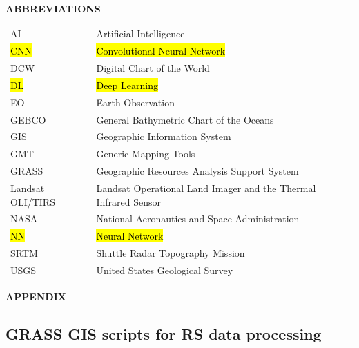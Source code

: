 \documentclass[12pt,a4paper,oneside]{article}
\def \newsection{\vspace{12pt}\textbf}
\begin{document}
\vspace{12pt}

\newsection {ABBREVIATIONS}
\vspace{12pt}

\begin{tabular}{@{}ll}
AI & Artificial Intelligence \\
\hl{CNN} & \hl{Convolutional Neural Network} \\
DCW & Digital Chart of the World \\
\hl{DL} & \hl{Deep Learning} \\
EO & Earth Observation\\
GEBCO & General Bathymetric Chart of the Oceans \\
GIS & Geographic Information System \\
GMT & Generic Mapping Tools \\
GRASS & Geographic Resources Analysis Support System \\
Landsat OLI/TIRS & Landsat Operational Land Imager and the Thermal Infrared Sensor \\
NASA & National Aeronautics and Space Administration \\
\hl{NN} & \hl{Neural Network} \\
SRTM & Shuttle Radar Topography Mission \\
USGS & United States Geological Survey
\end{tabular}

\vspace{12pt}

\newsection {APPENDIX}\label{App}
\vspace{12pt}

\subsection*{GRASS GIS scripts for RS data processing}
\end{document}
